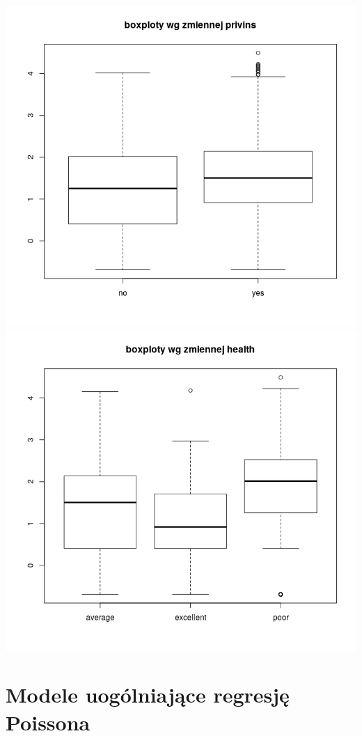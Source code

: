 \documentclass[a4paper,11pt]{article}
\begin{document}
\includegraphics[scale=.45]{Rplot6.png} 
\includegraphics[scale=.45]{Rplot7.png} 

\section{Modele uogólniające regresję Poissona}
\end{document}
